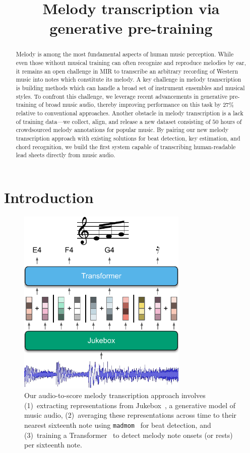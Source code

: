 \documentclass{article}
\title{
Melody transcription via generative pre-training
}
\newcommand{\madmom}{\texttt{madmom}}
\begin{document}
\maketitle

\begin{abstract}
Melody is among the most fundamental aspects of human music perception. 
While even those without musical training can often recognize and reproduce melodies by ear, it remains an open challenge in MIR to transcribe an arbitrary recording of Western music into notes which constitute its melody. 
A key challenge in melody transcription is building methods which can handle a broad set of instrument ensembles and musical styles. 
To confront this challenge, we leverage recent advancements in generative pre-training of broad music audio, thereby improving performance on this task by $27$\% relative to conventional approaches.
Another obstacle in melody transcription is a lack of training data---we collect, align, and release a new dataset consisting of $50$ hours of crowdsourced melody annotations for popular music. 
By pairing our new melody transcription approach with existing solutions for beat detection, key estimation, and chord recognition, 
we build the first system capable of transcribing human-readable lead sheets directly from music audio.
\end{abstract}


\section{Introduction}\label{sec:introduction}

\begin{figure}
    \centering
    \includegraphics[width=8.1cm]{figs/fig1.pdf}
    \caption{
Our audio-to-score melody transcription approach involves 
(1)~extracting representations from Jukebox~\cite{dhariwal2020jukebox}, a generative model of music audio, 
(2)~averaging these representations across time to their nearest sixteenth note using \madmom~\cite{bock2016madmom,bock2016joint} for beat detection,
and
(3)~training a Transformer~\cite{vaswani2017attention} to detect melody note onsets (or rests) per sixteenth note.
}
 \label{fig:fig1}
\end{figure}
\end{document}
